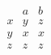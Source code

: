 \documentclass{standalone}
\begin{document}
$\begin{array}{l|rr}
    &   a   &   b\\
\hline
x   &   y   &   z\\
y   &   x   &   x\\
z   &   z   &   z
\end{array}$
\end{document}
